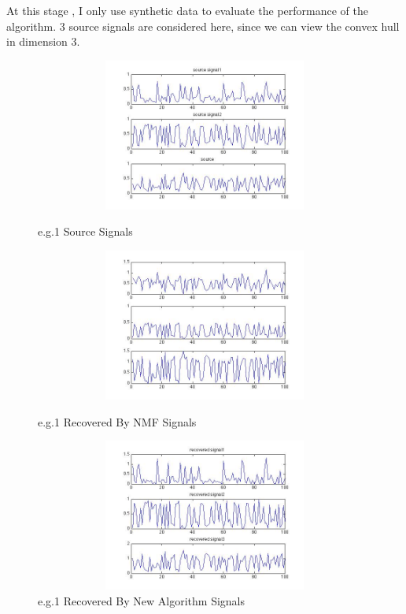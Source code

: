 \documentclass[14pt]{book}
\begin{document}
\setcounter{chapter}{4}
\setcounter{equation}{0} %
At this stage , I only use synthetic data to evaluate the performance of the algorithm.  
3 source signals are considered here, since we can view the convex hull  in dimension 3. 

\setcounter{chapter}{5}
\setcounter{equation}{0} %
\begin{figure}[ht!]

\includegraphics[width=150mm,height = 50mm]{eg1source.jpg}
\caption{e.g.1 Source Signals}
\label{overflow}
\includegraphics[width=150mm,height = 50mm]{eg1recoveredByNMF.jpg}
\caption{e.g.1 Recovered By NMF Signals}
\label{overflow}
\includegraphics[width=150mm,height = 50mm]{eg1RecoveredByNewAlgorithm.jpg}
\caption{e.g.1 Recovered By New Algorithm Signals}
\label{overflow}
\end{figure}
\end{document}
